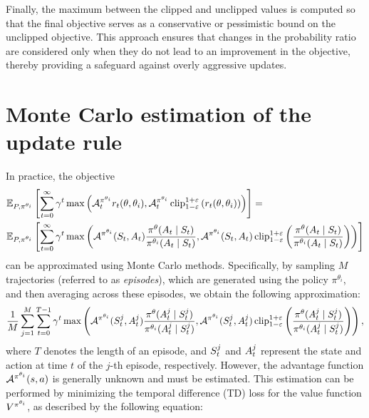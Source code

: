 \documentclass[12pt,twoside]{../../mitthesis}
\begin{document}
Finally, the maximum between the clipped and unclipped values is computed so that the final objective serves as a conservative or pessimistic bound on the unclipped objective. This approach ensures that changes in the probability ratio are considered only when they do not lead to an improvement in the objective, thereby providing a safeguard against overly aggressive updates.

\section*{Monte Carlo estimation of the update rule}
In practice, the objective 
$$
\begin{aligned}
&\E[\transit, \policy^{\theta_i}]{\sum_{t=0}^{\infty} \gamma ^ t \max\left(\Advan_t^{\policy^{\theta_i}} r_t(\theta, \theta_i), \Advan_t^{\policy^{\theta_i}}\operatorname{clip}_{1 - \varepsilon}^{1 + \varepsilon}\left(r_t(\theta, \theta_i) \right)\right)} = \\
&\E[\transit, \policy^{\theta_i}]{\sum_{t=0}^{\infty} \gamma ^ t \max\left(\Advan^{\policy^{\theta_i}}(\State_t, \Action_t)   \frac{\policy^{\theta}(\Action_t \mid \State_t)}{\policy^{\theta_i}(\Action_t \mid \State_t)}, \Advan^{\policy^{\theta_i}}(\State_t, \Action_t) \operatorname{clip}_{1 - \varepsilon}^{1 + \varepsilon}\left(\frac{\policy^{\theta}(\Action_t \mid \State_t)}{\policy^{\theta_i}(\Action_t \mid \State_t)}\right) \right)}
\end{aligned}
$$
can be approximated using Monte Carlo methods. Specifically, by sampling $M$ trajectories (referred to as \textit{episodes}), which are generated using the policy $\pi^{\theta_i}$, and then averaging across these episodes, we obtain the following approximation:
$$
    \frac{1}{M} \sum_{j = 1}^M \sum_{t=0}^{T-1} \gamma ^ t \max\left(\Advan^{\policy^{\theta_i}}(\State_t^j, \Action_t^j)   \frac{\policy^{\theta}(\Action_t^j \mid \State_t^j)}{\policy^{\theta_i}(\Action_t^j \mid \State_t^j)}, \Advan^{\policy^{\theta_i}}(\State_t^j, \Action_t^j) \operatorname{clip}_{1 - \varepsilon}^{1 + \varepsilon}\left(\frac{\policy^{\theta}(\Action_t^j \mid \State_t^j)}{\policy^{\theta_i}(\Action_t^j \mid \State_t^j)}\right) \right),
$$
where $T$ denotes the length of an episode, and  $\State_t^j$  and $\Action_t^j$ represent the state and action at time $t$ of the $j$-th episode, respectively.
However, the advantage function $\Advan^{\policy^{\theta_i}}(s, a)$ is generally unknown and must be estimated. This estimation can be performed by minimizing the temporal difference (TD) loss for the value function  $\Value^{\policy^{\theta_i}}$, as described by the following equation:
\end{document}
